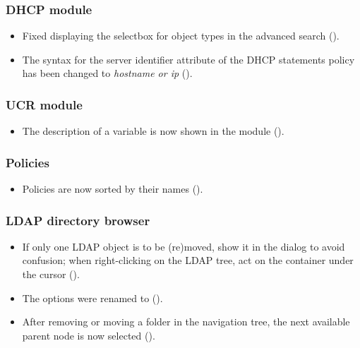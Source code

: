 \subsubsection{DHCP module}
\begin{itemize}
\item Fixed displaying the selectbox for object types in the advanced
  search ().
\item The syntax for the server identifier attribute of the DHCP
  statements policy has been changed to \emph{hostname or ip}
  ().
\end{itemize}

\subsubsection{UCR module}
\begin{itemize}
\item The description of a \ucsUCR{} variable is now shown in the module ().
\end{itemize}

\subsubsection{Policies}
\begin{itemize}
\item Policies are now sorted by their names ().
\end{itemize}

\subsubsection{LDAP directory browser}
\begin{itemize}
\item If only one LDAP object is to be (re)moved, show it in the dialog to
  avoid confusion; when right-clicking on the LDAP tree, act on the container
  under the cursor ().
\item The  options were renamed to
    ().
\item After removing or moving a folder in the navigation tree, the next
  available parent node is now selected ().
\end{itemize}


